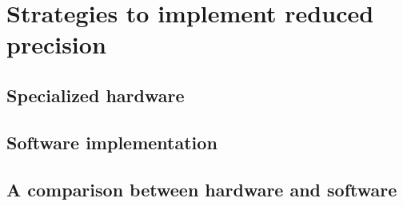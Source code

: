 \chapter{Strategies to implement reduced precision}
\begin{comment}
    Discuss:
    1. Specialized Hardware
    2. Software implementation
    3. Compare both strategies
\end{comment}

\section{Specialized hardware}
\section{Software implementation}
\section{A comparison between hardware and software}